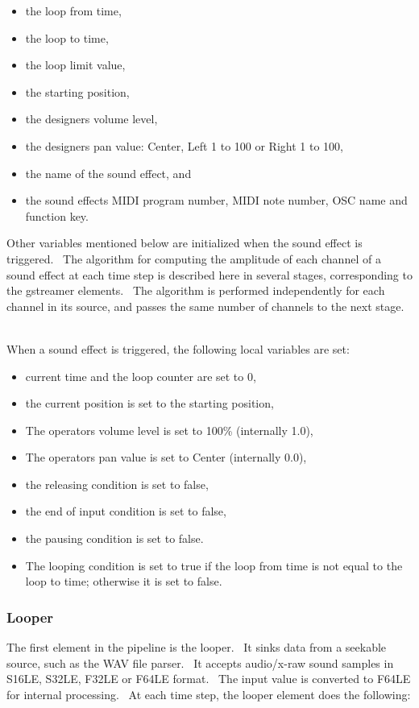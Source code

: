 \documentclass[letterpaper]{article}
\newcommand\liststyleLviii{%
\renewcommand\labelitemi{•}
\renewcommand\labelitemii{◦}
\renewcommand\labelitemiii{${\blacksquare}$}
\renewcommand\labelitemiv{•}
}
\newcommand\liststyleLix{%
\renewcommand\labelitemi{•}
\renewcommand\labelitemii{◦}
\renewcommand\labelitemiii{${\blacksquare}$}
\renewcommand\labelitemiv{•}
}
\begin{document}
\liststyleLviii
\begin{itemize}
\item the loop from time, 
\item the loop to time, 
\item the loop limit value, 
\item the starting position,
\item the designer{\textquotesingle}s volume level,
\item the designer{\textquotesingle}s pan value: Center, Left 1 to 100
or Right 1 to 100,
\item the name of the sound effect, and
\item the sound effect{\textquotesingle}s MIDI program number, MIDI note
number, OSC name and function key.
\end{itemize}
Other variables mentioned below are initialized when the sound effect is
triggered. \ The algorithm for computing the amplitude of each channel
of a sound effect at each time step is described here in several
stages, corresponding to the gstreamer elements. \ The algorithm is
performed independently for each channel in its source, and passes the
same number of channels to the next stage. \ 

When a sound effect is triggered, the following local variables are set:

\liststyleLix
\begin{itemize}
\item current time and the loop counter are set to 0,
\item the current position is set to the starting position,
\item The operator{\textquotesingle}s volume level is set to 100\%
(internally 1.0),
\item The operator{\textquotesingle}s pan value is set to Center
(internally 0.0),
\item the releasing condition is set to false,
\item the end of input condition is set to false,
\item the pausing condition is set to false.
\item The looping condition is set to true if the loop from time is not
equal to the loop to time; otherwise it is set to false.
\end{itemize}
\subsubsection[Looper]{Looper}
The first element in the pipeline is the looper. \ It sinks data from a
seekable source, such as the WAV file parser. \ It accepts audio/x-raw
sound samples in S16LE, S32LE, F32LE or F64LE format. \ The input value
is converted to F64LE for internal processing. \ At each time step, the
looper element does the following:
\end{document}
